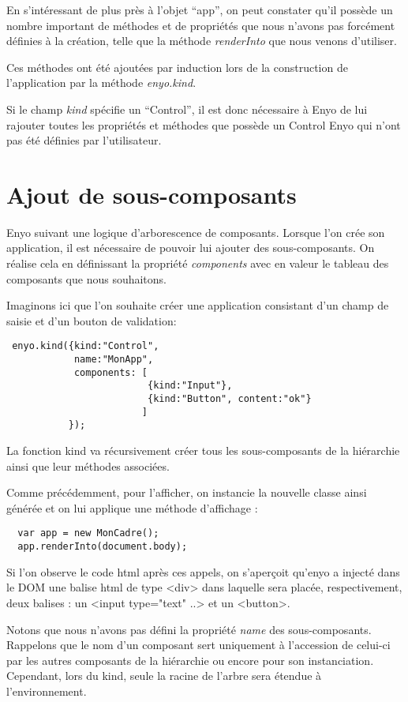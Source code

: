 \documentclass[11pt,a4paper]{report}
\begin{document}
En s'intéressant de plus près à l'objet ``app'', on peut constater qu'il
possède un nombre important de méthodes et de propriétés que nous n'avons 
pas forcément définies à la création, telle que la méthode \emph{renderInto}
que nous venons d'utiliser.

Ces méthodes ont été ajoutées par induction lors de la construction de 
l'application par la méthode \emph{enyo.kind}.

Si le champ \emph{kind} spécifie un ``Control'', il est donc nécessaire à Enyo de
lui rajouter toutes les propriétés et méthodes que possède un Control Enyo qui
n'ont pas été définies par l'utilisateur.

\section{Ajout de sous-composants}
Enyo suivant une logique d'arborescence de composants. Lorsque l'on crée 
son application, il est nécessaire de pouvoir lui ajouter des sous-composants. 
On réalise cela en définissant la propriété \emph{components} avec en valeur le tableau 
des composants que nous souhaitons.

Imaginons ici que l'on souhaite créer une application consistant d'un champ de saisie 
et d'un bouton de validation:
\begin{lstlisting}
 enyo.kind({kind:"Control",
            name:"MonApp",
            components: [
                         {kind:"Input"},
                         {kind:"Button", content:"ok"}
                        ]
           });
\end{lstlisting}

La fonction kind va récursivement créer tous les sous-composants de la hiérarchie 
ainsi que leur méthodes associées.

Comme précédemment, pour l'afficher, on instancie la nouvelle classe ainsi générée 
et on lui applique une méthode d'affichage : 

\begin{lstlisting}
  var app = new MonCadre();
  app.renderInto(document.body);
\end{lstlisting}

Si l'on observe le code html après ces appels, on s'aperçoit qu'enyo a injecté dans 
le DOM une balise html de type <div> dans laquelle sera placée, respectivement, 
deux balises : un <input type="text" ..> et un <button>.

\vbox{Notons que nous n'avons pas défini la propriété \emph{name} des sous-composants. 
Rappelons que le nom d'un composant sert uniquement à l'accession de celui-ci par les 
autres composants de la hiérarchie ou encore pour son instanciation. Cependant, lors du kind, 
seule la racine de l'arbre sera étendue à l'environnement.}
\end{document}
